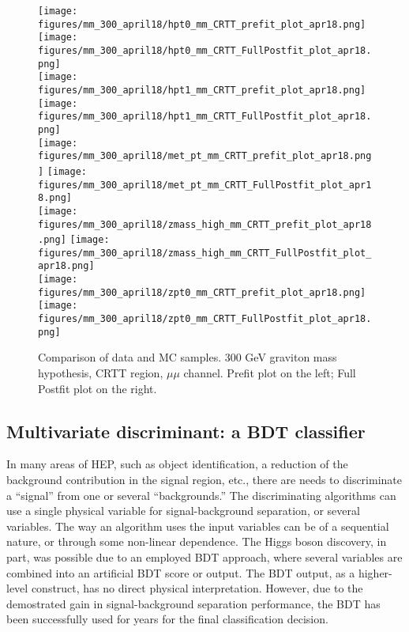 \begin{figure}[H]
\begin{center}
\texttt{[image: figures/mm\_300\_april18/hpt0\_mm\_CRTT\_prefit\_plot\_apr18.png]}
\texttt{[image: figures/mm\_300\_april18/hpt0\_mm\_CRTT\_FullPostfit\_plot\_apr18.png]}\\
\texttt{[image: figures/mm\_300\_april18/hpt1\_mm\_CRTT\_prefit\_plot\_apr18.png]}
\texttt{[image: figures/mm\_300\_april18/hpt1\_mm\_CRTT\_FullPostfit\_plot\_apr18.png]}\\
\texttt{[image: figures/mm\_300\_april18/met\_pt\_mm\_CRTT\_prefit\_plot\_apr18.png]}
\texttt{[image: figures/mm\_300\_april18/met\_pt\_mm\_CRTT\_FullPostfit\_plot\_apr18.png]}\\
\texttt{[image: figures/mm\_300\_april18/zmass\_high\_mm\_CRTT\_prefit\_plot\_apr18.png]}
\texttt{[image: figures/mm\_300\_april18/zmass\_high\_mm\_CRTT\_FullPostfit\_plot\_apr18.png]}\\
\texttt{[image: figures/mm\_300\_april18/zpt0\_mm\_CRTT\_prefit\_plot\_apr18.png]}
\texttt{[image: figures/mm\_300\_april18/zpt0\_mm\_CRTT\_FullPostfit\_plot\_apr18.png]}\\
\caption[Data-MC comparison in CRTT, other variables.]{Comparison of data and MC samples. 300 GeV graviton mass hypothesis, CRTT region, $\mu\mu$ channel. Prefit plot on the left; Full Postfit plot on the right.}
\label{MCcomparisons_mm_low_CRTT_2}
\end{center}
\end{figure}

\subsection{Multivariate discriminant: a BDT classifier}

In many areas of HEP, such as object identification, a reduction of the background contribution in the signal region, etc., there are needs to discriminate a ``signal'' from one or several ``backgrounds.'' The discriminating algorithms can use a single physical variable for signal-background separation, or several variables. The way an algorithm uses the input variables can be of a sequential nature, or through some non-linear dependence. The Higgs boson discovery, in part, was possible due to an employed BDT approach, where several variables are combined into an artificial BDT score or output. The BDT output, as a higher-level construct, has no direct physical interpretation. However, due to the demostrated gain in signal-background separation performance, the BDT has been successfully used for years for the final classification decision. 

